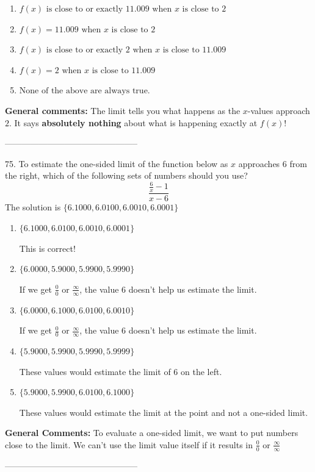 \documentclass{extbook}[14pt]
\begin{document}
\begin{enumerate}[label=\Alph*.] 
\item $ f(x) \text{ is close to or exactly } 11.009 \text{ when } x \text{ is close to } 2 $ 

  
\item $ f(x) = 11.009 \text{ when } x \text{ is close to } 2 $ 

  
\item $ f(x) \text{ is close to or exactly } 2 \text{ when } x \text{ is close to } 11.009 $ 

  
\item $ f(x) = 2 \text{ when } x \text{ is close to } 11.009 $ 

  
\item $ \text{None of the above are always true.} $ 

  
\end{enumerate} 
 
\textbf{General comments:} The limit tells you what happens as the $x$-values approach $2$. It says \textbf{absolutely nothing} about what is happening exactly at $f(x)$!

-----------------------------------------------

75. To estimate the one-sided limit of the function below as $x$ approaches 6 from the right, which of the following sets of numbers should you use?
\[ \frac{\frac{6}{x} - 1}{x - 6} \] 
The solution is $ \{ 6.1000, 6.0100, 6.0010, 6.0001 \} $ 

\begin{enumerate}[label=\Alph*.] 
\item $ \{ 6.1000, 6.0100, 6.0010, 6.0001 \} $ 

 This is correct! 
\item $ \{ 6.0000, 5.9000, 5.9900, 5.9990 \} $ 

 If we get $\frac{0}{0}$ or $\frac{\infty}{\infty}$, the value 6 doesn't help us estimate the limit. 
\item $ \{ 6.0000, 6.1000, 6.0100, 6.0010 \} $ 

 If we get $\frac{0}{0}$ or $\frac{\infty}{\infty}$, the value 6 doesn't help us estimate the limit. 
\item $ \{ 5.9000, 5.9900, 5.9990, 5.9999 \} $ 

 These values would estimate the limit of 6 on the left. 
\item $ \{ 5.9000, 5.9900, 6.0100, 6.1000 \} $ 

 These values would estimate the limit at the point and not a one-sided limit. 
\end{enumerate} 
 
\textbf{General Comments:} To evaluate a one-sided limit, we want to put numbers close to the limit. We can't use the limit value itself if it results in $\frac{0}{0}$ or $\frac{\infty}{\infty}$

-----------------------------------------------
\end{document}

